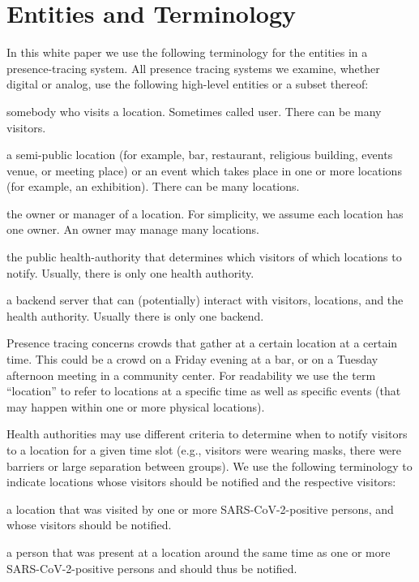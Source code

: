\section{Entities and Terminology}

In this white paper we use the following terminology for the entities in a presence-tracing system. All presence tracing systems we examine, whether digital or analog, use the following high-level entities or a subset thereof:

\begin{description}[topsep=2pt, partopsep=2pt]
\item[Visitor] somebody who visits a location. Sometimes called user. There can be many visitors.
\item[Location] a semi-public location (for example, bar, restaurant, religious building, events venue, or meeting place) or an event which takes place in one or more locations (for example, an exhibition). There can be many locations.
\item[Location Owner] the owner or manager of a location. For simplicity, we assume each location has one owner. An owner may manage many locations.
\item[Health Authority] the public health-authority that determines which visitors of which locations to notify. Usually, there is only one health authority.
\item[Backend] a backend server that can (potentially) interact with visitors, locations, and the health authority. Usually there is only one backend.
\end{description}

Presence tracing concerns crowds that gather at a certain location at a certain time. This could be a crowd on a Friday evening at a bar, or on a Tuesday afternoon meeting in a community center. For readability we use the term ``location'' to refer to locations at a specific time as well as specific events (that may happen within one or more physical locations).

Health authorities may use different criteria to determine when to notify visitors to a location for a given time slot  (e.g., visitors were wearing masks, there were barriers or large separation between groups). We use the following terminology to indicate locations whose visitors should be notified and the respective visitors:
\begin{description}[topsep=2pt, partopsep=0pt]
\item[Trace location] a location that was visited by one or more SARS-CoV-2-positive persons, and whose visitors should be notified.
\item[Presence contact] a person that was present at a location around the same time as one or more SARS-CoV-2-positive persons and should thus be notified.
\end{description}
